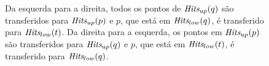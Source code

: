 \begin{figure}[H]
    \caption{Da esquerda para a direita,
        todos os pontos de $\textit{Hits}_{up}(q)$
        são transferidos para $\textit{Hits}_{up}(p)$
        e $p$, que está em $\textit{Hits}_{low}(q)$,
        é transferido para $\textit{Hits}_{low}(t)$.
        Da direita para a esquerda, os pontos
        em $\textit{Hits}_{up}(p)$ são transferidos
        para $\textit{Hits}_{up}(q)$ e $p$, que está
        em $\textit{Hits}_{low}(t)$, é transferido
        para $\textit{Hits}_{low}(q)$.}
    \label{fig:parcinetico:eventouptnaoexiste}
\end{figure}